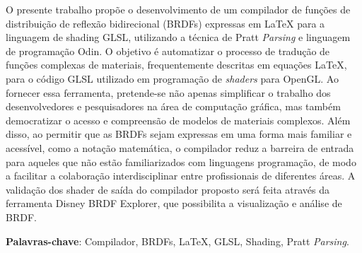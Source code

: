 \setlength{\absparsep}{18pt} %
\begin{resumo}
 


  O presente trabalho propõe o desenvolvimento de um compilador de funções de distribuição de reflexão bidirecional (BRDFs) expressas em LaTeX para a linguagem de shading GLSL, utilizando a técnica de Pratt \textit{Parsing} e linguagem de programação Odin. O objetivo é automatizar o processo de tradução de funções complexas de materiais, frequentemente descritas em equações LaTeX, para o código GLSL utilizado em programação de \textit{shaders} para OpenGL. Ao fornecer essa ferramenta, pretende-se não apenas simplificar o trabalho dos desenvolvedores e pesquisadores na área de computação gráfica, mas também democratizar o acesso e compreensão de modelos de materiais complexos. Além disso, ao permitir que as BRDFs sejam expressas em uma forma mais familiar e acessível, como a notação matemática, o compilador reduz a barreira de entrada para aqueles que não estão familiarizados com linguagens programação, de modo a facilitar a colaboração interdisciplinar entre profissionais de diferentes áreas. A validação dos shader de saída do compilador proposto será feita através da ferramenta Disney BRDF Explorer, que possibilita a visualização e análise de BRDF. 

  \textbf{Palavras-chave}: Compilador, BRDFs, LaTeX, GLSL, Shading, Pratt \textit{Parsing}.
\end{resumo}
